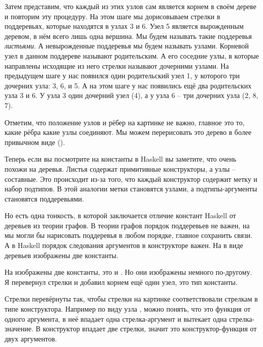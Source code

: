 
Затем представим, что каждый из этих узлов сам является 
корнем в своём дереве и повторим эту процедуру.
На этом шаге мы дорисовываем стрелки в поддеревьях, которые 
находятся в узлах 3 и 6. Узел 5 является вырожденным деревом,
в нём всего лишь одна вершина. Мы будем называть такие поддеревья
\emph{листьями}. А невырожденные поддеревья мы будем называть узлами.
Корневой узел в данном поддереве называют родительским. А его
соседние узлы, в которые направлены исходящие из него стрелки
называют дочерними узлами. На предыдущем шаге у нас появился
один родительский узел 1, у которого три дочерних узла: 3, 6, и 5. 
А на этом шаге у нас появились ещё два родительских узла 3 и 6.
У узла 3 один дочерний узел (4), а у узла 6 -- три дочерних узла (2, 8, 7).



Отметим, что положение узлов и рёбер на картинке не важно,
главное это то, какие рёбра какие узлы соединяют. Мы можем
перерисовать это дерево в более привычном виде ().

Теперь если вы посмотрите на константы в Haskell вы заметите,
что очень похожи на деревья. Листья содержат примитивные
конструкторы, а узлы -- составные. Это происходит из-за того,
что каждый конструктор содержит метку и набор подтипов. 
В этой аналогии  метки становятся узлами, а подтипы-аргументы 
становятся поддеревьями. 

Но есть одна тонкость, в которой 
заключается отличие констант Haskell от деревьев из теории графов. 
В теории графов порядок поддеревьев не важен, на  мы 
могли бы нарисовать поддеревья в любом порядке, главное сохранить 
связи. А в Haskell порядок следования аргументов в конструкторе 
важен. На  в виде деревьев изображены две константы.



На  изображены две константы, это 
и . Но они изображены
немного по-другому. Я перевернул стрелки и добавил корнем ещё один 
узел, это тип константы. 


Стрелки перевёрнуты так, чтобы стрелки
на картинке соответствовали стрелкам в типе конструктора.
Например по виду узла , можно понять, что это
функция от одного аргумента, в неё впадает одна стрелка-аргумент
и вытекает одна стрелка-значение. В конструктор  впадает
две стрелки, значит это конструктор-функция от двух аргументов.

